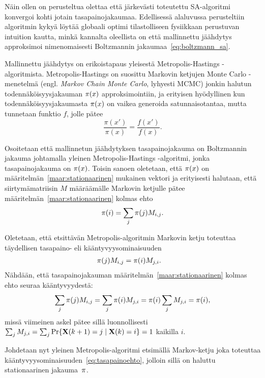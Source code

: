Näin ollen on perusteltua olettaa että järkevästi toteutettu SA-algoritmi konvergoi kohti jotain tasapainojakaumaa.
Edellisessä alaluvussa perusteltiin algoritmin kykyä löytää globaali optimi
tilastolliseen fysiikkaan perustuvan intuition kautta,
minkä kannalta oleellista on että mallinnettu jäähdytys approksimoi nimenomaisesti Boltzmannin jakaumaa~\ref{eq:boltzmann_sa}.

Mallinnettu jäähdytys on erikoistapaus yleisestä Metropolis-Hastings -algo\-rit\-mista.
Metropolis-Hastings on suosittu Markovin ketjujen Monte Carlo -menetelmä (engl. \emph{Markov Chain Monte Carlo}, lyhyesti MCMC)  jonkin halutun todennäköisyysjakauman $\mathbf{\pi}(x)$ approksimointiin,
ja erityisen hyödyllinen kun todennäköisyysjakaumasta $\mathbf{\pi}(x)$ on vaikea generoida satunnaisotantaa, mutta tunnetaan funktio $f$, jolle pätee
\begin{equation}
    \frac{\pi(x')}{\pi(x)} = \frac{f(x')}{f(x)}.
\end{equation}

Osoitetaan että mallinnetun jäähdytyksen tasapainojakauma on Boltzmannin jakauma johtamalla yleinen Metropolis-Hastings -algoritmi,
jonka tasapainojakauma on $\mathbf{\pi}(x)$.
Toisin sanoen oletetaan, että $\mathbf{\pi}(x)$ on määritelmän~\ref{maar:stationaarinen} mukainen vektori ja erityisesti halutaan, että siirtymämatriisin $M$ määräämälle Markovin ketjulle pätee määritelmän~\ref{maar:stationaarinen} kolmas ehto
\begin{equation}
    \mathbf{\pi}(i) = \sum_j \mathbf{\pi}(j) M_{i,j}.
\end{equation}

Oletetaan, että etsittävän Metropolis-algoritmin Markovin ketju toteuttaa täydellisen tasapaino- eli kääntyvyysominaisuuden
\begin{align}
    \label{eq:tasapainoehto}
    \mathbf{\pi}(j) M_{i,j} &= \mathbf{\pi}(i) M_{j,i}.
\end{align}
Nähdään, että tasapainojakauman määritelmän~\ref{maar:stationaarinen} kolmas ehto seuraa kääntyvyydestä:
\begin{equation}
    \sum_j \mathbf{\pi}(j) M_{i,j} = \sum_j \mathbf{\pi}(i) M_{j,i}
                                 = \mathbf{\pi}(i) \sum_j M_{j,i}
                                 = \mathbf{\pi}(i), \label{eq:station_johto}
\end{equation}
missä viimeinen askel pätee sillä luonnollisesti $\sum_j M_{j,i} = \sum_j \Pr\{ \mathbf{X}(k+1) = j \mid \mathbf{X}(k) = i \} = 1$ kaikilla $i$.

Johdetaan nyt yleinen Metropolis-algoritmi etsimällä Markov-ketju joka toteuttaa kääntyvyysominaisuuden~\ref{eq:tasapainoehto},
jolloin sillä on haluttu stationaarinen jakauma~$\mathbf{\pi}$.

